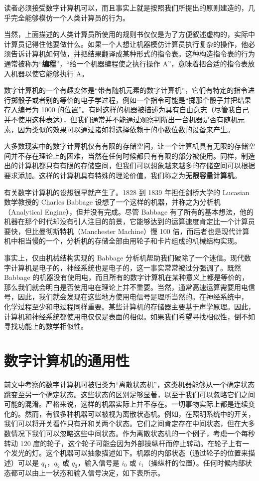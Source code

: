 \documentclass[12pt,a4paper,twoside]{article}
\begin{document}
读者必须接受数字计算机可以，而且事实上就是按照我们所提出的原则建造的，几乎完全能够模仿一个人类计算员的行为。

当然，上面描述的人类计算员所使用的规则书仅仅是为了方便叙述虚构的，实际中计算员记得住他要做什么。如果一个人想让机器模仿计算员执行复杂的操作，他必须告诉计算机如何做，并把结果翻译成某种形式的指令表。这种构造指令表的行为通常被称为“\textbf{编程}”，“给一个机器编程使之执行操作 A”，意味着把合适的指令表放入机器以使它能够执行 A。

数字计算机的一个有趣变体是“带有随机元素的数字计算机”，它们有特定的指令进行掷骰子或者别的等价的电子学过程，例如一个指令可能是“掷那个骰子并把结果存入编号为 1000 的位置”。有时这样的机器被描述为具有自由意志（尽管我自己并不使用这种表达），但我们通常并不能通过观察判断出一台机器是否有随机元素，因为类似的效果可以通过诸如将选择依赖于的小数位数的设备来产生。

大多数现实中的数字计算机仅有有限的存储空间，让一个计算机具有无限的存储空间并不存在理论上的困难，当然在任何时候都只有有限的部分被使用。同样，制造出的计算机都只有有限的存储空间，但我们可以想象越来越多的存储空间可以根据要求添加。这样的计算机具有特殊的理论价值，我们称之为\textbf{无限容量计算机}。

有关数字计算机的设想很早就产生了。1828 到 1839 年担任剑桥大学的 Lucasian 数学教授的 Charles Babbage 设想了一个这样的机器，并称之为分析机（Analytical Engine），但并没有完成。尽管 Babbage 有了所有的基本想法，他的机器在那个时代却没有引人注目的前景，它能够达到的运算速度肯定比一个计算员要快，但比曼彻斯特机（Manchester Machine）慢 100 倍，而后者也是现代计算机中相当慢的一个，分析机的存储全部由用轮子和卡片组成的机械结构实现。

事实上，仅由机械结构实现的 Babbage 分析机帮助我们破除了一个迷信。现代数字计算机是电子的，神经系统也是电子的，这一事实常常被过分强调了。既然 Babbage 的机器没有使用电，而且所有的数字计算机在某种意义上都是等价的，那么我们就会明白是否使用电在理论上并不重要。当然，通常高速运算需要用电信号，因此，我们就会发现在这些地方使用电信号是理所当然的。在神经系统中， 化学过程至少和电过程同样重要。某些计算机的存储器主要基于声学原理。因此，计算机和神经系统都使用电仅仅是表面的相似。如果我们希望寻找相似性，倒不如寻找功能上的数学相似性。

\section{数字计算机的通用性}
前文中考察的数字计算机可被归类为“离散状态机”，这类机器能够从一个确定状态跳变至另一个确定状态。这些状态的区别足够显著，以至于我们可以忽略它们之间可能的混淆。严格来说，这样的机器实际上并不存在。一切事物实际上都是连续变化的。然而，有很多种机器可以被视为离散状态机。例如，在照明系统中的开关，我们可以将开关看作只有开和关两个状态。它们之间肯定存在中间状态，但在大多数情况下我们可以忽略这些中间状态。作为离散状态机的一个例子，考虑一个每秒转动 120 度的轮子，这个轮子可能会因为外部操纵杆而停止转动。在轮子上有一个发光的灯。这个机器可以抽象描述如下。机器的内部状态（通过轮子的位置来描述）可以是 $q_1$，$q_2$ 或 $q_3$，输入信号是 $i_0$ 或 $i_1$（操纵杆的位置）。任何时候内部状态都可以由上一状态和输入信号决定，如下表所示。
\end{document}
